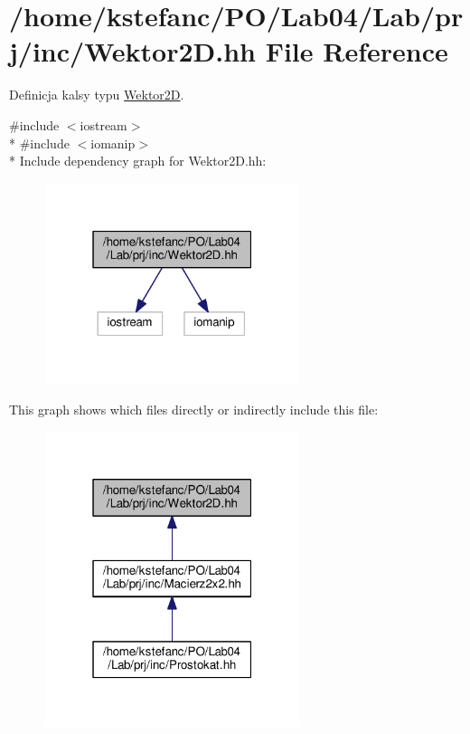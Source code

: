 \hypertarget{_wektor2_d_8hh}{\section{/home/kstefanc/\+P\+O/\+Lab04/\+Lab/prj/inc/\+Wektor2\+D.hh File Reference}
\label{_wektor2_d_8hh}
}


Definicja kalsy typu \hyperlink{class_wektor2_d}{Wektor2\+D}.  


{\ttfamily \#include $<$iostream$>$}\\*
{\ttfamily \#include $<$iomanip$>$}\\*
Include dependency graph for Wektor2\+D.\+hh\+:\nopagebreak
\begin{figure}[H]
\begin{center}
\leavevmode
\includegraphics[width=211pt]{_wektor2_d_8hh__incl}
\end{center}
\end{figure}
This graph shows which files directly or indirectly include this file\+:\nopagebreak
\begin{figure}[H]
\begin{center}
\leavevmode
\includegraphics[width=211pt]{_wektor2_d_8hh__dep__incl}
\end{center}
\end{figure}
